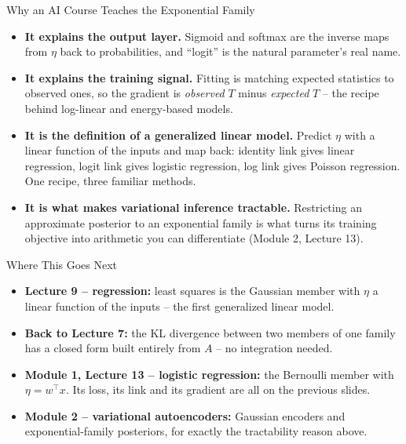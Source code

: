 \begin{frame}{Why an AI Course Teaches the Exponential Family}
\begin{itemize}
  \item \textbf{It explains the output layer.} Sigmoid and softmax are the inverse maps from $\eta$ back to probabilities, and ``logit'' is the natural parameter's real name.
  \pause
  \item \textbf{It explains the training signal.} Fitting is matching expected statistics to observed ones, so the gradient is \emph{observed} $T$ minus \emph{expected} $T$ -- the recipe behind log-linear and energy-based models.
  \pause
  \item \textbf{It is the definition of a generalized linear model.} Predict $\eta$ with a linear function of the inputs and map back: identity link gives linear regression, logit link gives logistic regression, log link gives Poisson regression. One recipe, three familiar methods.
  \pause
  \item \textbf{It is what makes variational inference tractable.} Restricting an approximate posterior to an exponential family is what turns its training objective into arithmetic you can differentiate (Module 2, Lecture 13).
\end{itemize}
\end{frame}

\begin{frame}{Where This Goes Next}
\begin{itemize}
  \item \textbf{Lecture 9 -- regression:} least squares is the Gaussian member with $\eta$ a linear function of the inputs -- the first generalized linear model.
  \pause
  \item \textbf{Back to Lecture 7:} the KL divergence between two members of one family has a closed form built entirely from $A$ -- no integration needed.
  \pause
  \item \textbf{Module 1, Lecture 13 -- logistic regression:} the Bernoulli member with $\eta = w^{\top}x$. Its loss, its link and its gradient are all on the previous slides.
  \pause
  \item \textbf{Module 2 -- variational autoencoders:} Gaussian encoders and exponential-family posteriors, for exactly the tractability reason above.
\end{itemize}
\end{frame}

